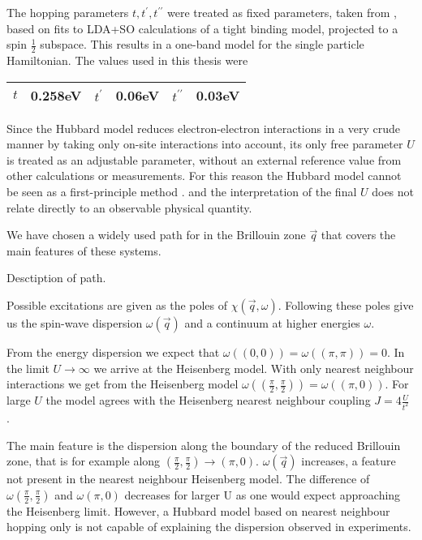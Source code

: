 \documentclass[a4paper,10pt]{report}
\begin{document}
The hopping parameters $t,t^{\prime},t^{\prime \prime}$ were treated as fixed parameters, taken from 
\cite{PhysRevLett.106.136402}, based on fits to LDA+SO calculations of a tight binding model, projected to a spin $\frac12$ subspace. 
This results in a one-band model for the single particle Hamiltonian.
The values used in this thesis were \newline
\begin{tabular}{|r@{=}l|r@{=}l|r@{=}l|}
\hline
$t$ & 0.258eV &
$t^{\prime}$ & 0.06eV &
$t^{\prime \prime}$ & 0.03eV \\
\hline
\end{tabular}
\newline
{}


Since the Hubbard model reduces electron-electron interactions in a very crude manner by taking only on-site interactions into account,
its only free parameter $U$ is treated as an adjustable parameter, without an external reference value from other calculations or measurements.	
For this reason the Hubbard model cannot be seen as a first-principle method \cite{J.Phys.Cond.Matter.Vol21.34}.
and the interpretation of the final $U$ does not relate directly to an observable physical quantity.

We have chosen a widely used path for in the Brillouin zone $\vec q$ that covers the main features of these systems.

Desctiption of path. 

Possible excitations are given as the poles of $\chi(\vec q,\omega)$. 
Following these poles give us the spin-wave dispersion $\omega(\vec q)$ and a continuum at higher energies $\omega$.

From the energy dispersion  we expect that $\omega( (0,0) ) = \omega(( \pi,\pi )) = 0$.
In the limit $U\rightarrow \infty$ we arrive at the Heisenberg model. 
With only nearest neighbour interactions we get from the Heisenberg model
$\omega( (\frac{\pi}{2}, \frac{\pi}2 )) = \omega(( \pi,0))$.
For large $U$ the model agrees with the Heisenberg nearest neighbour coupling $J=4\frac{U}{t^2}$ .

The main feature is the dispersion along the boundary of the reduced Brillouin zone, that is for example along $(\frac{\pi}2,\frac{\pi}2) \rightarrow (\pi,0)$.
$\omega(\vec q)$ increases, a feature not present in the nearest neighbour Heisenberg model. 
The difference of $\omega(\frac{\pi}2,\frac{\pi}2)$ and $\omega(\pi,0)$ decreases for larger U as one would expect approaching the Heisenberg limit.
However, a Hubbard model based on nearest neighbour hopping only is not capable of explaining the dispersion observed in experiments.
\end{document}
